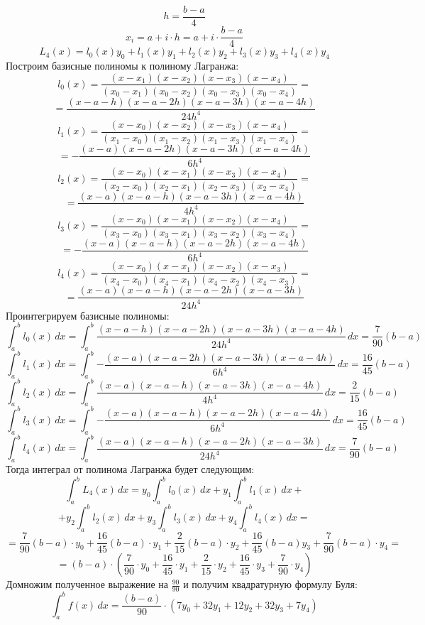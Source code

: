 \documentclass[14pt, titlepage, a4paper]{extarticle} %
\begin{document}
	\[h = \frac{b-a}{4} \]
	\[x_i = a + i \cdot h = a + i\cdot \frac{b - a}{4} \]
	\[L_4(x) = l_0(x)y_0 + l_1(x)y_1 + l_2(x)y_2 + l_3(x)y_3 + l_4(x)y_4 \]
	Построим базисные полиномы к полиному Лагранжа:
	\[l_0(x) = \frac{(x - x_1)(x - x_2)(x - x_3)(x - x_4)}{(x_0 - x_1)(x_0 - x_2)(x_0 - x_3)(x_0 - x_4)} = \]
	\[ = \frac{(x - a - h)(x - a - 2h)(x - a - 3h)(x - a - 4h)}{24h^4} \]
	\[l_1(x) = \frac{(x - x_0)(x - x_2)(x - x_3)(x - x_4)}{(x_1 - x_0)(x_1 - x_2)(x_1 - x_3)(x_1 - x_4)} =\]
	\[ = -\frac{(x - a)(x -a - 2h)(x - a - 3h)(x - a - 4h)}{6h^4} \]
	\[l_2(x) = \frac{(x - x_0)(x - x_1)(x - x_3)(x - x_4)}{(x_2 - x_0)(x_2 - x_1)(x_2 - x_3)(x_2 - x_4)} = \]
	\[= \frac{(x - a)(x - a - h)(x - a - 3h)(x - a - 4h)}{4h^4} \]
	\[l_3(x) = \frac{(x - x_0)(x - x_1)(x - x_2)(x - x_4)}{(x_3 - x_0)(x_3 - x_1)(x_3 - x_2)(x_3 - x_4)} = \]
	\[= -\frac{(x - a)(x - a - h)(x - a - 2h)(x - a - 4h)}{6h^4} \]
	\[l_4(x) = \frac{(x - x_0)(x - x_1)(x - x_2)(x - x_3)}{(x_4 - x_0)(x_4 - x_1)(x_4 - x_2)(x_4 - x_3)} = \]
	\[= \frac{(x - a)(x - a - h)(x - a - 2h)(x - a - 3h)}{24h^4} \]
	Проинтегрируем базисные полиномы:
	\[\int_{a}^{b}{l_0(x)\,dx} = \int_{a}^{b}{\frac{(x - a - h)(x - a - 2h)(x - a - 3h)(x - a - 4h)}{24h^4}\,dx} = \frac{7}{90}(b-a) \]
	\[\int_{a}^{b}{l_1(x)\,dx} = \int_{a}^{b}{-\frac{(x - a)(x -a - 2h)(x - a - 3h)(x - a - 4h)}{6h^4}\,dx} = \frac{16}{45}(b-a) \]
	\[\int_{a}^{b}{l_2(x)\,dx} = \int_{a}^{b}{\frac{(x - a)(x - a - h)(x - a - 3h)(x - a - 4h)}{4h^4}\,dx} = \frac{2}{15}(b-a) \]
	\[\int_{a}^{b}{l_3(x)\,dx} = \int_{a}^{b}{-\frac{(x - a)(x - a - h)(x - a - 2h)(x - a - 4h)}{6h^4}\,dx} = \frac{16}{45}(b-a) \]
	\[\int_{a}^{b}{l_4(x)\,dx} = \int_{a}^{b}{\frac{(x - a)(x - a - h)(x - a - 2h)(x - a - 3h)}{24h^4}\,dx} = \frac{7}{90}(b-a) \]
	Тогда интеграл от полинома Лагранжа будет следующим:
	\[\int_{a}^{b}{L_4(x)\,dx} = y_0\int_{a}^{b}{l_0(x)\,dx} + y_1\int_{a}^{b}{l_1(x)\,dx} +\] \[ + y_2\int_{a}^{b}{l_2(x)\,dx} + y_3\int_{a}^{b}{l_3(x)\,dx} + y_4\int_{a}^{b}{l_4(x)\,dx} = \]
	\[= \frac{7}{90}(b-a)\cdot y_0 + \frac{16}{45}(b-a)\cdot y_1 + \frac{2}{15}(b-a)\cdot y_2 + \frac{16}{45}(b-a)y_3 + \frac{7}{90}(b-a)\cdot y_4 = \]
	\[= (b - a) \cdot \left(\frac{7}{90}\cdot y_0 + \frac{16}{45}\cdot y_1 + \frac{2}{15}\cdot y_2 + \frac{16}{45} \cdot y_3 + \frac{7}{90} \cdot y_4 \right) \]
	Домножим полученное выражение на $\frac{90}{90}$ и получим квадратурную формулу Буля:
	\[\int_{a}^{b}{f(x)\,dx} = \frac{(b - a)}{90} \cdot \left(7y_0 + 32y_1 + 12y_2 + 32y_3 + 7y_4 \right) \]
	
	
\end{document}
